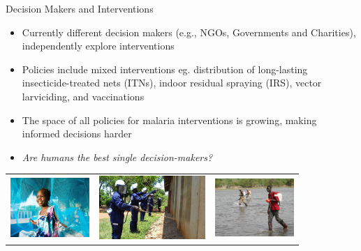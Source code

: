 \documentclass[10pt,usenames,dvipsnames]{beamer}
\begin{document}
\begin{frame}{Decision Makers and Interventions}

\begin{itemize}
\item Currently different decision makers (e.g., NGOs, Governments and Charities), independently explore interventions
\item Policies include mixed interventions eg. distribution of long-lasting insecticide-treated nets (ITNs), indoor residual spraying (IRS), vector larviciding, and vaccinations
\item The space of all policies for malaria interventions is growing, making informed decisions harder 
\item \textit{Are humans the best single decision-makers?}
\end{itemize}

\centering
        \begin{tabular}{ccc}
        
        \includegraphics[width=3cm]{images/Bednet.jpeg}
        &
         \includegraphics[width=4cm]{images/IRS.jpg}
         &
         \includegraphics[width=3cm]{images/larv.jpeg}
        
      \end{tabular}

\end{frame}
%
%
%
%
%        
%        
%
%
%
%
\end{document}
